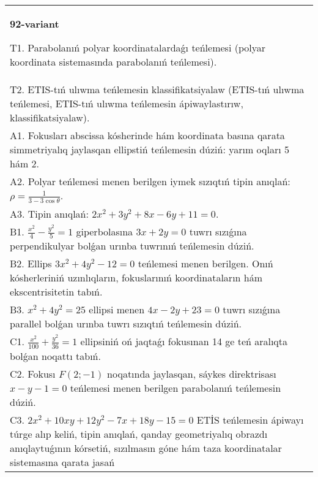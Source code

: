 \documentclass{article}
\begin{document}
\begin{tabular}{m{17cm}}
\textbf{92-variant}
\newline

T1. Parabolanıń polyar koordinatalardaǵı teńlemesi (polyar koordinata sistemasında parabolanıń teńlemesi).\\

T2. ETIS-tıń ulıwma teńlemesin klassifikatsiyalaw (ETIS-tıń ulıwma teńlemesi, ETIS-tıń ulıwma teńlemesin ápiwaylastırıw, klassifikatsiyalaw).\\

A1. Fokusları abscissa kósherinde hám koordinata basına qarata simmetriyalıq jaylasqan ellipstiń teńlemesin dúziń: yarım oqları 5 hám 2.\\

A2. Polyar teńlemesi menen berilgen iymek sızıqtıń tipin anıqlań: $\rho=\frac{1}{3-3\cos\theta}$.\\

A3. Tipin anıqlań: $2 x^{2}+3 y^{2}+8 x-6 y+11=0$.\\

B1. $\frac{x^{2}}{4} - \frac{y^{2}}{5} = 1$ giperbolasına $3x + 2y = 0$ tuwrı sızıǵına perpendikulyar bolǵan urınba tuwrınıń teńlemesin dúziń.\\

B2. Ellips $3x^{2} + 4y^{2} - 12 = 0$ teńlemesi menen berilgen. Onıń kósherleriniń uzınlıqların, fokuslarınıń koordinataların hám ekscentrisitetin tabıń.  \\

B3. $x^{2} + 4y^{2} = 25$ ellipsi menen $4x - 2y + 23 = 0$ tuwrı sızıǵına parallel bolǵan urınba tuwrı sızıqtıń teńlemesin dúziń.  \\

C1. $\frac{x^{2}}{100} + \frac{y^{2}}{36} = 1$ ellipsiniń oń jaqtaǵı fokusınan 14 ge teń aralıqta bolǵan noqattı tabıń.  \\

C2. Fokusı $F(2; - 1)$ noqatında jaylasqan, sáykes direktrisası $x - y - 1 = 0$ teńlemesi menen berilgen parabolanıń teńlemesin dúziń.  \\

C3. $2x^{2} + 10xy + 12y^{2} - 7x + 18y - 15 = 0$ ETİS teńlemesin ápiwayı túrge alıp keliń, tipin anıqlań, qanday geometriyalıq obrazdı anıqlaytuǵının kórsetiń, sızılmasın góne hám taza koordinatalar sistemasına qarata jasań  \\

\end{tabular}
\vspace{1cm}
\end{document}
